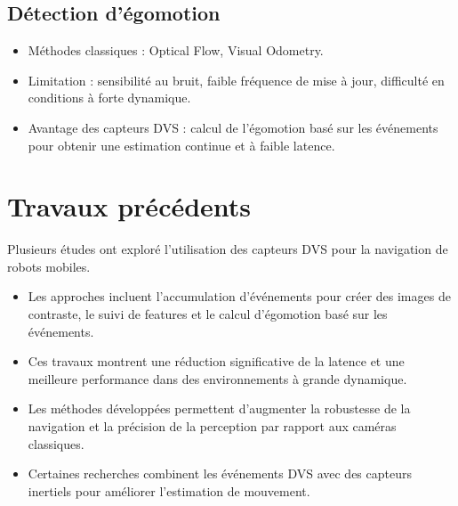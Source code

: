 \subsection{Détection d’égomotion}

\begin{itemize}
    \item Méthodes classiques : Optical Flow, Visual Odometry.  
    \item Limitation : sensibilité au bruit, faible fréquence de mise à jour, difficulté en conditions à forte dynamique.  
    \item Avantage des capteurs DVS : calcul de l’égomotion basé sur les événements pour obtenir une estimation continue et à faible latence.  
\end{itemize}

\section{Travaux précédents}

Plusieurs études ont exploré l’utilisation des capteurs DVS pour la navigation de robots mobiles.  

\begin{itemize}
    \item Les approches incluent l’accumulation d’événements pour créer des images de contraste, le suivi de features et le calcul d’égomotion basé sur les événements.  
    \item Ces travaux montrent une réduction significative de la latence et une meilleure performance dans des environnements à grande dynamique.  
    \item Les méthodes développées permettent d’augmenter la robustesse de la navigation et la précision de la perception par rapport aux caméras classiques.  
    \item Certaines recherches combinent les événements DVS avec des capteurs inertiels pour améliorer l’estimation de mouvement.  
\end{itemize}

